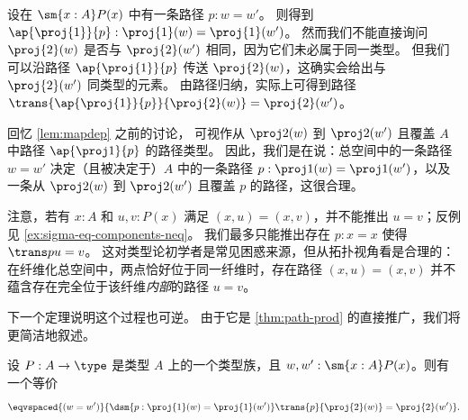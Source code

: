 设在 $\sm{x:A}P(x)$ 中有一条路径 $p:w=w'$。
则得到 $\ap{\proj{1}}{p}:\proj{1}(w)=\proj{1}(w')$。
然而我们不能直接询问 $\proj{2}(w)$ 是否与 $\proj{2}(w')$ 相同，因为它们未必属于同一类型。
但我们可以沿路径 $\ap{\proj{1}}{p}$ 传送 $\proj{2}(w)$，这确实会给出与 $\proj{2}(w')$ 同类型的元素。
由路径归纳，实际上可得到路径 $\trans{\ap{\proj{1}}{p}}{\proj{2}(w)}=\proj{2}(w')$。

回忆 \cref{lem:mapdep} 之前的讨论，
可视作从 $\proj2(w)$ 到 $\proj2(w')$ 且覆盖 $A$ 中路径 $\ap{\proj1}{p}$ 的路径类型。
%
%
因此，我们是在说：总空间中的一条路径 $w=w'$ 决定（且被决定于）$A$ 中的一条路径 $p:\proj1(w)=\proj1(w')$，以及一条从 $\proj2(w)$ 到 $\proj2(w')$ 且覆盖 $p$ 的路径，这很合理。

\begin{rmk}\label{rmk:sigma-equality-extraction}
  注意，若有 $x:A$ 和 $u,v:P(x)$ 满足 $(x,u)=(x,v)$，并不能推出 $u=v$；反例见 \cref{ex:sigma-eq-components-neq}。
  我们最多只能推出存在 $p:x=x$ 使得 $\trans p u = v$。
  这对类型论初学者是常见困惑来源，但从拓扑视角看是合理的：在纤维化总空间中，两点恰好位于同一纤维时，存在路径 $(x,u)=(x,v)$ 并不蕴含存在完全位于该纤维\emph{内部}的路径 $u=v$。
\end{rmk}

下一个定理说明这个过程也可逆。
由于它是 \cref{thm:path-prod} 的直接推广，我们将更简洁地叙述。

\begin{thm}\label{thm:path-sigma}
设 $P:A\to\type$ 是类型 $A$ 上的一个类型族，且 $w,w':\sm{x:A}P(x)$。则有一个等价
\begin{equation*}
\eqvspaced{(w=w')}{\dsm{p:\proj{1}(w)=\proj{1}(w')} \trans{p}{\proj{2}(w)}=\proj{2}(w')}.
\end{equation*}
\end{thm}

